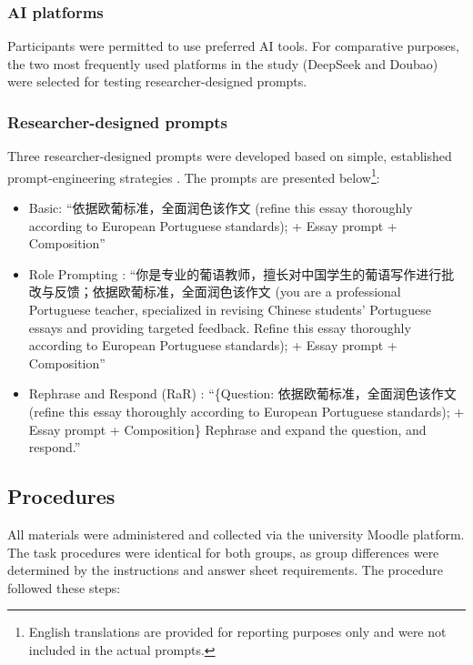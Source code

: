\documentclass[english]{textolivre}
\begin{document}
\subsubsection{AI platforms}
Participants were permitted to use preferred AI tools. For comparative purposes, the two most frequently used platforms in the study (DeepSeek and Doubao) were selected for testing researcher-designed prompts.

\subsubsection{Researcher-designed prompts}

Three researcher-designed prompts were developed based on simple, established prompt-engineering strategies \cite{tian2025taxonomy, 2024schulho}. The prompts are presented below\footnote{English translations are provided for reporting purposes only and were not included in the actual prompts.}:

\begin{itemize}


    \item Basic: ``依据欧葡标准，全面润色该作文 (refine this essay thoroughly according to European Portuguese standards); + Essay prompt + Composition''
    \item Role Prompting \cite{zheng2024helpful}: ``你是专业的葡语教师，擅长对中国学生的葡语写作进行批改与反馈；依据欧葡标准，全面润色该作文 (you are a professional Portuguese teacher, specialized in revising Chinese students' Portuguese essays and providing targeted feedback. Refine this essay thoroughly according to European Portuguese standards); + Essay prompt + Composition''
    \item Rephrase and Respond (RaR) \cite{deng2023rephrase}: ``\{Question: 依据欧葡标准，全面润色该作文 (refine this essay thoroughly according to European Portuguese standards); + Essay prompt + Composition\} Rephrase and expand the question, and respond.''
\end{itemize}

\subsection{Procedures}\label{3.3}

All materials were administered and collected via the university Moodle platform. The task procedures were identical for both groups, as group differences were determined by the instructions and answer sheet requirements. The procedure followed these steps:
\end{document}
